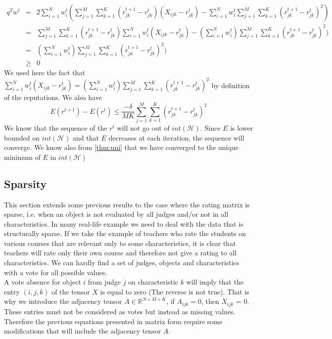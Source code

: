 \documentclass[12pt,a4paper]{article}
\begin{document}
\begin{eqnarray*}
q^Tw^t & = & 2 \sum_{i=1}^N w^t_i (\sum_{j=1}^M \sum_{k=1}^K (r^{t+1}_{jk}-r^t_{jk})(X_{ijk}-r^t_{jk}) - \sum_{i=1}^N w^t_i \sum_{j=1}^M \sum_{k=1}^K  (r^{t+1}_{jk} - r^t_{jk})^2)\\
& = & \sum_{j=1}^M \sum_{k=1}^K (r^{t+1}_{jk}-r^t_{jk}) \sum_{i=1}^N w^t_i (X_{ijk}-r_{jk}^t)- (\sum_{i=1}^N w^t_i) \sum_{j=1}^M \sum_{k=1}^K  (r^{t+1}_{jk} - r^t_{jk})^2)\\
& = & (\sum_{i=1}^N w^t_i) \sum_{j=1}^M \sum_{k=1}^K  (r^{t+1}_{jk} - r^t_{jk})^2)\\
& \geq & 0
\end{eqnarray*}
We used here the fact that $\sum_{i=1}^N w^t_i (X_{ijk}-r_{jk}^t) = (\sum_{i=1}^N w^t_i) \sum_{j=1}^M \sum_{k=1}^K  (r^{t+1}_{jk} - r^t_{jk})^2$ by definition of the reputations.
We also have 
$$E(r^{t+1})- E(r^t) \leq \frac{-\delta}{MK} \sum_{j=1}^M \sum_{k=1}^K (r^{t+1}_{jk} - r^t_{jk})^2$$
We know that the sequence of the $r^t$ will not go out of $int(\mathcal{H})$.
Since $E$ is lower bounded on $int(\mathcal{H})$ and that $E$ decreases at each iteration, the sequence will converge. We know also from \ref{thm:uni} that we have converged to the unique minimum of $E$ in $int(\mathcal{H})$


\subsection{Sparsity}

This section extends some previous results to the case where the rating matrix is sparse, i.e. when an object is not evaluated by all judges and/or not in all characteristics. In many real-life example we need to deal with the data that is structurally sparse. If we take the example of teachers who rate the students on various courses that are relevant only to some characteristics, it is clear that teachers will rate only their own course and therefore not give a rating to all characteristics. We can hardly find a set of judges, objects and characteristics with a vote for all possible values.\\

A vote absence for object $i$ from judge $j$ on characteristic $k$ will imply that the entry $(i, j, k)$ of the tensor $X$ is equal to zero (The reverse is not true). That is why we introduce the adjacency tensor $A \in \mathbb{R}^{N \times M \times K}$, if $A_{ijk} = 0$, then $X_{ijk}$ = 0. These entries must not be considered as votes but instead as missing values. Therefore the previous equations presented in matrix form require some modifications that will include the adjacency tensor $A$.
\end{document}
